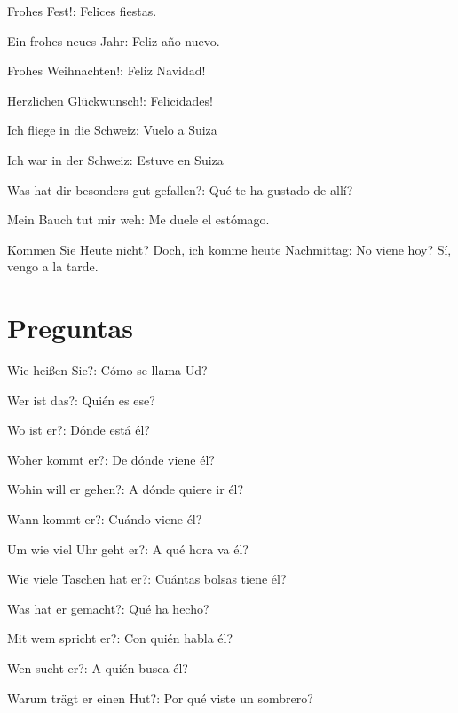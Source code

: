 \begin{myitemize}
\item Frohes Fest!: Felices fiestas.
\item Ein frohes neues Jahr: Feliz año nuevo.
\item Frohes Weihnachten!: Feliz Navidad!
\item Herzlichen Glückwunsch!: Felicidades!
\item Ich fliege in die Schweiz: Vuelo a Suiza
\item Ich war in der Schweiz: Estuve en Suiza
\item Was hat dir besonders gut gefallen?: Qué te ha gustado de allí?
\item Mein Bauch tut mir weh: Me duele el estómago.
\item Kommen Sie Heute nicht? Doch, ich komme heute Nachmittag: No viene hoy? Sí, vengo a la tarde.
\end{myitemize}

\section{Preguntas}
\begin{myitemize}
\item Wie heißen Sie?: Cómo se llama Ud?
\item Wer ist das?: Quién es ese?
\item Wo ist er?: Dónde está él?
\item Woher kommt er?: De dónde viene él?
\item Wohin will er gehen?: A dónde quiere ir él?
\item Wann kommt er?: Cuándo viene él?
\item Um wie viel Uhr geht er?: A qué hora va él?
\item Wie viele Taschen hat er?: Cuántas bolsas tiene él?
\item Was hat er gemacht?: Qué ha hecho?
\item Mit wem spricht er?: Con quién habla él?
\item Wen sucht er?: A quién busca él?
\item Warum trägt er einen Hut?: Por qué viste un sombrero?
\end{myitemize}


